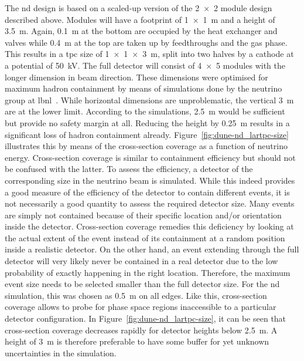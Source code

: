 The \AC{} \gls{nd} design is based on a scaled-up version of the \num{2 x 2} module design described above.
Modules will have a footprint of \SI{1 x 1}{\metre} and a height of \SI{3.5}{\metre}.
Again, \SI{0.1}{\metre} at the bottom are occupied by the heat exchanger and valves while \SI{0.4}{\metre} at the top are taken up by feedthroughs and the gas phase.
This results in a \gls{tpc} size of \SI{1 x 1 x 3}{\metre}, split into two halves by a cathode at a potential of \SI{50}{\kilo\volt}.
The full detector will consist of \num{4 x 5} modules with the longer dimension in beam direction.
These dimensions were optimised for maximum hadron containment by means of simulations done by the neutrino group at \gls{lbnl}~\cite{lartpcSizeChris}.
While horizontal dimensions are unproblematic, the vertical \SI{3}{\metre} are at the lower limit.
According to the simulations, \SI{2.5}{\metre} would be sufficient but provide no safety margin at all.
Reducing the height by \SI{0.25}{\metre} results in a significant loss of hadron containment already.
Figure~\ref{fig:dune-nd_lartpc-size} illustrates this by means of the cross-section coverage as a function of neutrino energy.
Cross-section coverage is similar to containment efficiency but should not be confused with the latter.
To assess the efficiency, a detector of the corresponding size in the neutrino beam is simulated.
While this indeed provides a good measure of the efficiency of the detector to contain different events, it is not necessarily a good quantity to assess the required detector size.
Many events are simply not contained because of their specific location and/or orientation inside the detector.
Cross-section coverage remedies this deficiency by looking at the actual extent of the event instead of its containment at a random position inside a realistic detector.
On the other hand, an event extending through the full detector will very likely never be contained in a real detector due to the low probability of exactly happening in the right location.
Therefore, the maximum event size needs to be selected smaller than the full detector size.
For the \gls{nd} simulation, this was chosen as \SI{0.5}{\metre} on all edges.
Like this, cross-section coverage allows to probe for phase space regions inaccessible to a particular detector configuration.
In Figure~\ref{fig:dune-nd_lartpc-size}, it can be seen that cross-section coverage decreases rapidly for detector heights below \SI{2.5}{\metre}.
A height of \SI{3}{\metre} is therefore preferable to have some buffer for yet unknown uncertainties in the simulation.

